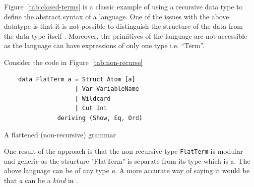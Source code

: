 \documentclass[thesis-solanki.tex]{subfiles}
\begin{document}
Figure~\ref{tab:closed-terms} is a classic example of using a recursive data type to define the
abstract syntax of a language.
One of the issues with the above datatype is that it is not possible to distinguish the structure of the data from the
data type itself \cite{sheard2004two}.
Moreover, the primitives of the language
are not accessible as the language can have expressions of only one
type i.e. ``Term''.

Consider the code in Figure~\ref{tab:non-recurse}
\begin{code-list}
  \begin{verbatim}
    data FlatTerm a = Struct Atom [a]
                    | Var VariableName
                    | Wildcard
                    | Cut Int
               deriving (Show, Eq, Ord)
  \end{verbatim}
  \caption{A flattened (non-recursive) grammar}
  \label{tab:non-recurse}
\end{code-list}

One result of the approach is that the non-recursive type
\texttt{FlatTerm} is modular and generic as the structure
"FlatTerm"
is separate
from its
type which is a.
The above language can be of any type \textit{a}. A more accurate way of saying it would be that \textit{a} can be a \textit{kind} in
.
\end{document}
